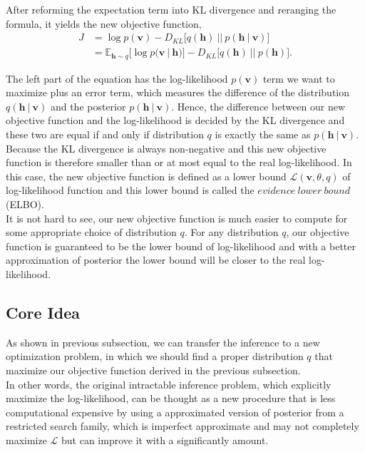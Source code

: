 \documentclass[conference]{IEEEtran}
\begin{document}
After reforming the expectation term into KL divergence and reranging the formula, it yields the new objective function,
\begin{equation}
  \begin{split}
	J &= \log p(\boldsymbol{v}) - D_{KL}\bigg[q(\boldsymbol{h})\ ||\ p(\boldsymbol{h}\ |\ \boldsymbol{v})\bigg]\\
  &=\mathbb{E}_{\boldsymbol{h}\sim q}\bigg[\log p(\boldsymbol{v}\ |\ \boldsymbol{h})\bigg]-D_{KL}\bigg[q(\boldsymbol{h})\ ||\ p(\boldsymbol{h})\bigg].
  \end{split}  
\end{equation}

The left part of the equation has the log-likelihood $p(\boldsymbol{v})$ term we want to maximize plus an error term, which measures the difference of the distribution $q(\boldsymbol{h}\ |\ \boldsymbol{v})$ and the posterior $p(\boldsymbol{h}\ |\ \boldsymbol{v})$. Hence, the difference between our new objective function and the log-likelihood is decided by the KL divergence and these two are equal if and only if distribution $q$ is exactly the same as $p(\boldsymbol{h}\ |\ \boldsymbol{v})$. Because the KL divergence is always non-negative and this new objective function is therefore smaller than or at most equal to the real log-likelihood. In this case, the new objective function is defined as a lower bound $\mathcal{L}(\boldsymbol{v}, \theta, q)$ of log-likelihood function and this lower bound is called the $evidence\ lower\ bound$(ELBO).\\

It is not hard to see, our new objective function is much easier to compute for some appropriate choice of distribution $q$. For any distribution $q$, our objective function is guaranteed to be the lower bound of log-likelihood and with a better approximation of posterior the lower bound will be closer to the real log-likelihood.
\subsection{Core Idea}
As shown in previous subsection, we can transfer the inference to a new optimization problem, in which we should find a proper distribution $q$ that maximize our objective function derived in the previous subsection. \\

In other words, the original intractable inference problem, which explicitly maximize the log-likelihood, can be thought as a new procedure that is less computational expensive  by using a approximated version of posterior from a restricted search family, which is imperfect approximate and may not completely maximize $\mathcal{L}$ but can improve it with a significantly amount.\\
\end{document}
